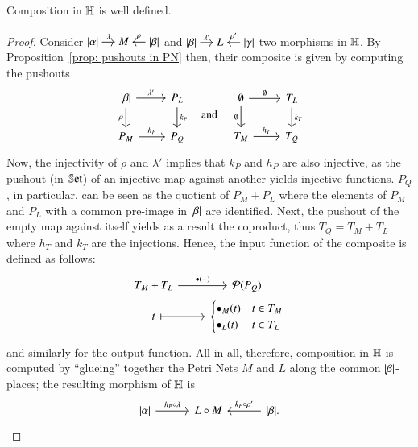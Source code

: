 \begin{proposition}
    Composition in $\mathbb H$ is well defined.
    \end{proposition}
\begin{proof}
Consider 
$
\begin{tikzcd}[cramped,sep=small]
\length\alpha \ar[r,"\lambda"] & M & \ar[l,"\rho"'] \length\beta
\end{tikzcd}
$
and
$
\begin{tikzcd}[cramped,sep=small]
\length\beta \ar[r,"\lambda'"] & L & \ar[l,"\rho'"'] \length\gamma
\end{tikzcd}
$
two morphisms in $\mathbb H$. By Proposition~\ref{prop: pushouts in PN} then, their composite is given by computing the pushouts
\[
\begin{tikzcd}
\length\beta \ar[r,"\lambda'"] \ar[d,"\rho"'] & P_L \ar[d,"k_P"] \\
P_M \ar[r,"h_P"] & P_Q
\end{tikzcd}
\quad \text{and} \quad
\begin{tikzcd}
\emptyset \ar[r,"\emptyset"] \ar[d,"\emptyset"'] & T_L \ar[d,"k_T"] \\
T_M \ar[r,"h_T"] & T_Q
\end{tikzcd}
\]
Now, the injectivity of $\rho$ and $\lambda'$ implies that $k_P$ and $h_P$ are also injective, as the pushout (in $\mathbb{S}\mathrm{et}$) of an injective map against another yields injective functions. $P_Q$, in particular, can be seen as the quotient of $P_M + P_L$ where the elements of $P_M$ and $P_L$ with a common pre-image in $\lvert \beta \rvert$ are identified. Next, the pushout of the empty map against itself yields as a result the coproduct, thus $T_Q = T_M + T_L$ where $h_T$ and $k_T$ are the injections. Hence, the input function of the composite is defined as follows:
\[
\begin{tikzcd}[row sep=0em,ampersand replacement=\&]
T_M + T_L \ar[r,"\inp{}"] \& \parts{P_Q} \\
t \ar[r,|->] \& \begin{cases}
\inp{_M(t)} & t \in T_M \\
\inp{_L(t)} & t \in T_L
\end{cases}
\end{tikzcd}
\]
and similarly for the output function. All in all, therefore, composition in $\mathbb H$ is computed by ``glueing'' together the Petri Nets $M$ and $L$ along the common $\lvert \beta \rvert$-places; the resulting morphism of $\mathbb H$ is
\[
\begin{tikzcd}[column sep=3em]
\length\alpha \ar[r,"h_P \circ \lambda"] & L \circ M & \length\beta \ar[l,"k_P \circ \rho'"']. 

\end{tikzcd}\]
\end{proof}
